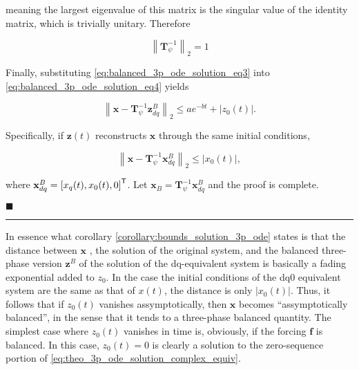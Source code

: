 	\noindent meaning the largest eigenvalue of this matrix is the singular value of the identity matrix, which is trivially unitary. Therefore

\begin{equation} \left\lVert \mathbf{T}^{-1}_\psi \right\rVert_2 = 1 \label{eq:balanced_3p_ode_solution_eq3} \end{equation}

	Finally, substituting \eqref{eq:balanced_3p_ode_solution_eq3} into \eqref{eq:balanced_3p_ode_solution_eq4} yields

\begin{equation} \left\lVert \mathbf{x} - \mathbf{T}^{-1}_\psi\mathbf{z}_{dq}^B\right\rVert_2 \leq ae^{-bt} + \left\lvert z_0(t) \right\rvert .\label{eq:balanced_3p_ode_solution_eq5}\end{equation}

	Specifically, if $\mathbf{z}(t)$ reconstructs $\mathbf{x}$ through the same initial conditions,

\begin{equation} \left\lVert \mathbf{x} - \mathbf{T}^{-1}_\psi\mathbf{x}_{dq}^B\right\rVert_2 \leq \left\lvert x_0(t) \right\rvert ,\end{equation}

	\noindent where $\mathbf{x}_{dq}^B = \left[x_q(t),x_0(t),0\right]^{\mathsf{T}}$. Let $\mathbf{x}_B = \mathbf{T}_\psi^{-1}\mathbf{x}_{dq}^B$ and the proof is complete.

\hfill$\blacksquare$
\vspace{5mm}
\hrule
\vspace{5mm}

	In essence what corollary \ref{corollary:bounds_solution_3p_ode} states is that the distance between $\mathbf{x}$ , the solution of the original system, and the balanced three-phase version $\mathbf{z}^B$ of the solution of the dq-equivalent system is basically a fading exponential added to $z_0$. In the case the initial conditions of the dq0 equivalent system are the same as that of $x(t)$, the distance is only $\left\lvert x_0(t)\right\rvert$. Thus, it follows that if $z_0(t)$ vanishes assymptotically, then $\mathbf{x}$ becomes ``assymptotically balanced'', in the sense that it tends to a three-phase balanced quantity. The simplest case where $z_0(t)$ vanishes in time is, obviously, if the forcing $\mathbf{f}$ is balanced. In this case, $z_0(t) = 0$ is clearly a solution to the zero-sequence portion of \eqref{eq:theo_3p_ode_solution_complex_equiv}.

